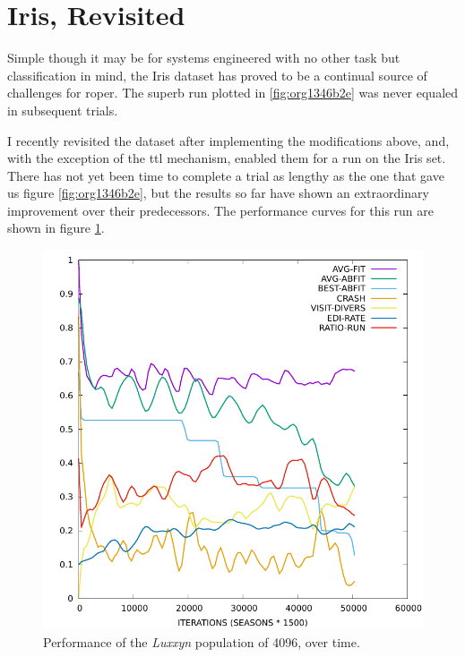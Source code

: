 \documentclass[12pt,glossary]{dalthesis}
\begin{document}
\section{Iris, Revisited}
\label{sec:org5bebc13}
Simple though it may be for systems engineered with no other task but classification in mind, the Iris dataset has 
proved to be a continual source of challenges for \gls{roper}. The superb run plotted in
\ref{fig:org1346b2e} was never equaled in subsequent trials. 

I recently revisited the dataset after implementing the modifications above, and, with
the exception of the \gls{ttl} mechanism, enabled them for a run on the Iris set. There
has not yet been time to complete a trial as lengthy as the one that gave us figure
\ref{fig:org1346b2e}, but the results so far have shown an extraordinary improvement over
their predecessors. The performance curves for this run are shown in figure \ref{fig:orga7d3680}. 



\begin{figure}[htbp]
\centering
\includegraphics[width=.9\linewidth]{../images/plots/luxxyn.pdf}
\caption{\label{fig:orga7d3680}
Performance of the \emph{Luxxyn} population of 4096, over time.}
\end{figure}
\end{document}
